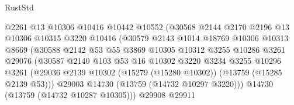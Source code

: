 \begin{lexlean}{RustStd}
\begin{coremodule}
                                  @2261
                                  @13
                                  @10306
                                  @10416
                                  @10442
                                  @10552
                                  (@30568
                                    @2144
                                    @2170
                                    @2196
                                    @13
                                    @10306
                                    @10315
                                    @3220
                                    @10416
                                    (@30579
                                      @2143
                                      @1014
                                      @18769
                                      @10306
                                      @10313
                                      @8669
                                      (@30588
                                        @2142
                                        @53
                                        @55
                                        @3869
                                        @10305
                                        @10312
                                        @3255
                                        @10286
                                        @3261
                                        @29076
                                        (@30587
                                          @2140
                                          @103
                                          @53
                                          @16
                                          @10302
                                          @3220
                                          @3234
                                          @3255
                                          @10296
                                          @3261
                                          (@29036
                                            @2139
                                            @10302
                                            (@15279 (@15280 @10302))
                                            (@13759 (@15285 @2139 @53)))
                                          @29003
                                          @14730
                                          (@13759 (@14732 @10297 @3220)))
                                        @14730
                                        (@13759 (@14732 @10287 @10305)))
                                      @29908
                                      @29911

\end{coremodule}
\end{lexlean}
